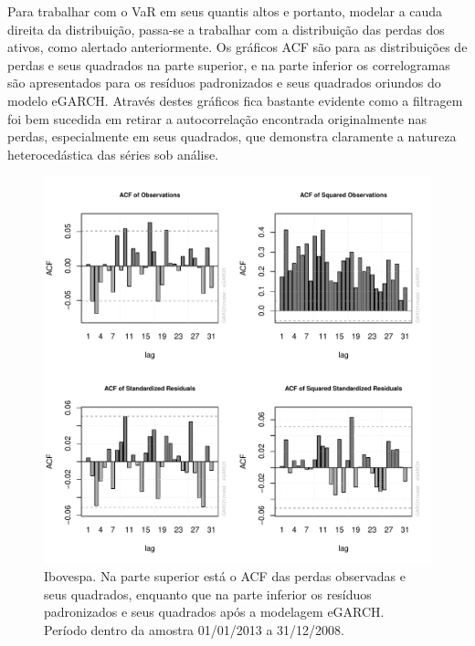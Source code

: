 \documentclass[1p]{elsarticle}
\theoremstyle{definition}
\begin{document}


Para trabalhar com o VaR em seus quantis altos e portanto, modelar a cauda direita da distribuição, passa-se a trabalhar com a distribuição das perdas dos ativos, como alertado anteriormente. Os gráficos ACF são para as distribuições de perdas e seus quadrados na parte superior, e na parte inferior os correlogramas são apresentados para os resíduos padronizados e seus quadrados oriundos do modelo eGARCH. Através destes gráficos fica bastante evidente como a filtragem foi bem sucedida em retirar a autocorrelação encontrada originalmente nas perdas, especialmente em seus quadrados, que demonstra claramente a natureza heterocedástica das séries sob análise. 

\begin{figure}[H]
	\centering
	\includegraphics[width=1\linewidth]{figs/artigo-acf-IBovespa}
	\caption{Ibovespa. Na parte superior está o ACF das perdas observadas e seus quadrados, enquanto que na parte inferior os resíduos padronizados e seus quadrados após a modelagem eGARCH. Período dentro da amostra 01/01/2013 a 31/12/2008.}
	\label{fig:artigo-acf-ibovespa}
\end{figure}
\end{document}
